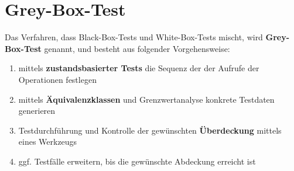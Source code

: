 \section{Grey-Box-Test}

\begin{tcolorbox}[title=Grey-Box-Test]
    Das Verfahren, dass Black-Box-Tests und White-Box-Tests mischt, wird \textbf{Grey-Box-Test} genannt, und besteht aus folgender Vorgehensweise:
    \begin{enumerate}
        \item mittels \textbf{zustandsbasierter Tests} die Sequenz der der Aufrufe der Operationen festlegen
        \item mittels \textbf{Äquivalenzklassen}  und Grenzwertanalyse konkrete Testdaten generieren
        \item Testdurchführung und Kontrolle der gewünschten \textbf{Überdeckung} mittels eines Werkzeugs
        \item ggf. Testfälle erweitern, bis die gewünschte Abdeckung erreicht ist
    \end{enumerate}
\end{tcolorbox}